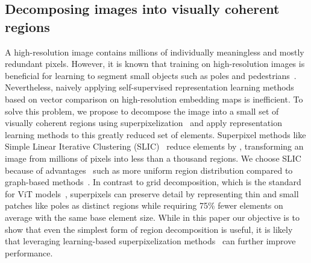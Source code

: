 \documentclass{bmvc2k}
\begin{document}
\subsection{Decomposing images into visually coherent regions}
A high-resolution image contains millions of individually meaningless and mostly redundant pixels. However, it is known that training on high-resolution images is beneficial for learning to segment small objects such as poles and pedestrians~\cite{Chen2018DeepLabV2}. Nevertheless, naively applying self-supervised representation learning methods based on vector comparison on high-resolution embedding maps is inefficient. To solve this problem, we propose to decompose the image into a small set of visually coherent regions using superpixelization~\cite{Ren2003Superpixels} and apply representation learning methods to this greatly reduced set of elements.
Superpixel methods like Simple Linear Iterative Clustering (SLIC)~\cite{Achanta2010SLICSuperpixels} reduce elements by , transforming an image from millions of pixels into less than a thousand regions. We choose SLIC because of advantages~\cite{AchantaSLICSOTA} such as more uniform region distribution compared to graph-based methods~\cite{Pedro2004FHsuperpixels}. 
In contrast to grid decomposition, which is the standard for ViT models~\cite{Dosovitskiy2021ViT, Caron2021DINO}, superpixels can preserve detail by representing thin and small patches like poles as distinct regions while requiring 75\% fewer elements on average with the same base element size.
While in this paper our objective is to show that even the simplest form of region decomposition is useful, it is likely that leveraging learning-based superpixelization methods~\cite{Arbelaez2014MGC, Locatello2020SlotAttention, Weinzaepfel2022Superfeatures} can further improve performance.
\end{document}
